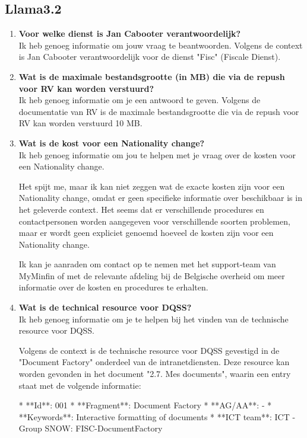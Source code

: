 \subsection{Llama3.2}
\begin{enumerate}
    \item \textbf{Voor welke dienst is Jan Cabooter verantwoordelijk?}\\
    Ik heb genoeg informatie om jouw vraag te beantwoorden. Volgens de context is Jan Cabooter verantwoordelijk voor de dienst "Fisc" (Fiscale Dienst).
    \item \textbf{Wat is de maximale bestandsgrootte (in MB) die via de repush voor RV kan worden verstuurd?}\\
    Ik heb genoeg informatie om je een antwoord te geven. Volgens de documentatie van RV is de maximale bestandsgrootte die via de repush voor RV kan worden verstuurd 10 MB.
    \item \textbf{Wat is de kost voor een Nationality change?}\\
    Ik heb genoeg informatie om jou te helpen met je vraag over de kosten voor een Nationality change.
    
    Het spijt me, maar ik kan niet zeggen wat de exacte kosten zijn voor een Nationality change, omdat er geen specifieke informatie over beschikbaar is in het geleverde context. Het seems dat er verschillende procedures en contactpersonen worden aangegeven voor verschillende soorten problemen, maar er wordt geen expliciet genoemd hoeveel de kosten zijn voor een Nationality change.
    
    Ik kan je aanraden om contact op te nemen met het support-team van MyMinfin of met de relevante afdeling bij de Belgische overheid om meer informatie over de kosten en procedures te erhalten.
    
    \item \textbf{Wat is de technical resource voor DQSS?}\\
    Ik heb genoeg informatie om je te helpen bij het vinden van de technische resource voor DQSS.
    
    Volgens de context is de technische resource voor DQSS gevestigd in de "Document Factory" onderdeel van de intranetdiensten. Deze resource kan worden gevonden in het document "2.7. Mes documents", waarin een entry staat met de volgende informatie:
    
    * **Id**: 001
    * **Fragment**: Document Factory
    * **AG/AA**: -
    * **Keywords**: Interactive formatting of documents
    * **ICT team**: ICT - Group SNOW: FISC-DocumentFactory
    

\end{enumerate}
